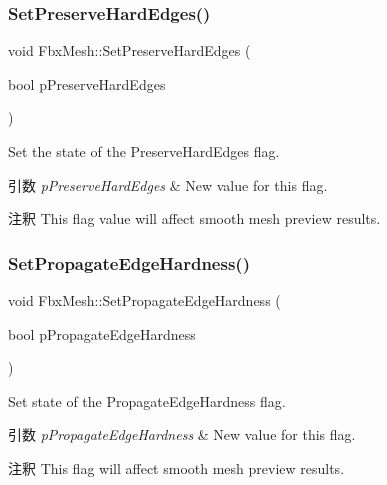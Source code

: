 \subsubsection{\texorpdfstring{Set\+Preserve\+Hard\+Edges()}{SetPreserveHardEdges()}}
{\footnotesize\ttfamily void Fbx\+Mesh\+::\+Set\+Preserve\+Hard\+Edges (\begin{DoxyParamCaption}\item[{bool}]{p\+Preserve\+Hard\+Edges }\end{DoxyParamCaption})}

Set the state of the Preserve\+Hard\+Edges flag. 
\begin{DoxyParams}{引数}
{\em p\+Preserve\+Hard\+Edges} & New value for this flag. \\
\hline
\end{DoxyParams}
\begin{DoxyRemark}{注釈}
This flag value will affect smooth mesh preview results. 
\end{DoxyRemark}
\mbox{\label{class_fbx_mesh_a1908668e29bfe832de7eec520d0d5cba}} 
\subsubsection{\texorpdfstring{Set\+Propagate\+Edge\+Hardness()}{SetPropagateEdgeHardness()}}
{\footnotesize\ttfamily void Fbx\+Mesh\+::\+Set\+Propagate\+Edge\+Hardness (\begin{DoxyParamCaption}\item[{bool}]{p\+Propagate\+Edge\+Hardness }\end{DoxyParamCaption})}

Set state of the Propagate\+Edge\+Hardness flag. 
\begin{DoxyParams}{引数}
{\em p\+Propagate\+Edge\+Hardness} & New value for this flag. \\
\hline
\end{DoxyParams}
\begin{DoxyRemark}{注釈}
This flag will affect smooth mesh preview results. 
\end{DoxyRemark}
\mbox{\label{class_fbx_mesh_a1e74780d575f601d6e28c52ff36b555d}} 
